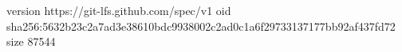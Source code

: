 version https://git-lfs.github.com/spec/v1
oid sha256:5632b23c2a7ad3e38610bdc9938002c2ad0c1a6f29733137177bb92af437fd72
size 87544
